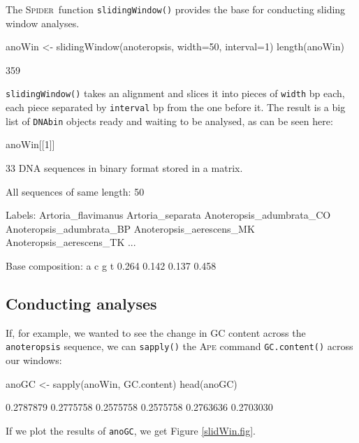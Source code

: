 \documentclass{article}
\newcommand{\spider}{\textsc{Spider}~} %
\newcommand{\progname}[1]{\textsc{#1}}
\newcommand{\fun}[1]{\texttt{#1}}
\begin{document}
The \spider function \fun{slidingWindow()} provides the base for conducting sliding window analyses. 

\begin{console}
anoWin <- slidingWindow(anoteropsis, width=50, interval=1)
length(anoWin)
\end{console}

\begin{Routput}
[1] 359
\end{Routput}

\fun{slidingWindow()} takes an alignment and slices it into pieces of \fun{width} bp each, each piece separated by \fun{interval} bp from the one before it. The result is a big list of \fun{DNAbin} objects ready and waiting to be analysed, as can be seen here:

\begin{console}
anoWin[[1]]
\end{console}

\begin{Routput}
33 DNA sequences in binary format stored in a matrix.

All sequences of same length: 50 

Labels: Artoria_flavimanus Artoria_separata Anoteropsis_adumbrata_CO 
Anoteropsis_adumbrata_BP Anoteropsis_aerescens_MK Anoteropsis_aerescens_TK ...

Base composition:
    a     c     g     t 
0.264 0.142 0.137 0.458 
\end{Routput}

\subsection{Conducting analyses}

If, for example, we wanted to see the change in GC content across the \fun{anoteropsis} sequence, we can \fun{sapply()} the \progname{Ape} command \fun{GC.content()} across our windows:

\begin{console}
anoGC <- sapply(anoWin, GC.content)
head(anoGC)
\end{console}
\begin{Routput}
[1] 0.2787879 0.2775758 0.2575758 0.2575758 0.2763636 0.2703030
\end{Routput}

If we plot the results of \fun{anoGC}, we get Figure \ref{slidWin.fig}.
\end{document}
